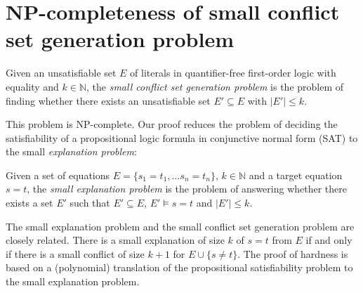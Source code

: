 \documentclass[smallextended]{svjour3}
\begin{document}
\section*{NP-completeness of small conflict set generation problem}
\label{sec:npcomplete}



\begin{definition}
Given an unsatisfiable set $E$ of literals in quantifier-free first-order logic
with equality and $k \in \mathbb{N}$, the \emph{small conflict set generation
  problem} is the problem of finding whether there exists an unsatisfiable set
$E' \subseteq E$ with $|E'| \leq k$.
\end{definition}
\noindent This problem is NP-complete.  Our proof reduces the problem
of deciding the satisfiability of a propositional logic formula in conjunctive
normal form (SAT) to the small \emph{explanation problem}:
\begin{definition}
Given a set of equations $E = \{ s_1=t_1,\ldots s_n=t_n\}$, $k \in
\mathbb{N}$ and a target equation $s = t$, the \emph{small explanation problem}
is the problem of answering whether there exists a set $E'$ such that $E'
\subseteq E$, $E' \models s = t$ and $|E'| \leq k$.
\end{definition}

\noindent The small explanation problem and the small conflict set generation
problem are closely related.  There is a small explanation of size $k$ of $s=t$
from $E$ if and only if there is a small conflict of size $k+1$ for $E \cup
\{s\neq t\}$.  The proof of hardness is based on a (polynomial) translation of
the propositional satisfiability problem to the small explanation problem.

\newcommand{\Assignment}{{\it Assignment}}
\newcommand{\Clause}{{\it Clause}}
\newcommand{\Connect}{{\it Connect}}
\end{document}
